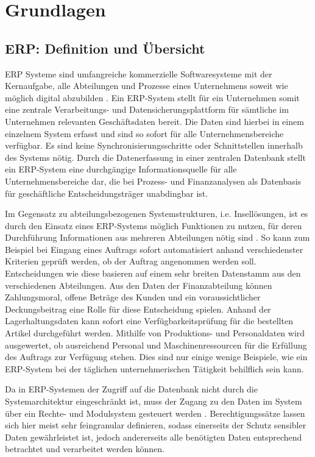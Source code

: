 \chapter{Grundlagen}
\label{cha:Stand der Technik}

\section{ERP: Definition und Übersicht}
\label{sec:ERP: Definition und Übersicht}
	ERP Systeme sind umfangreiche kommerzielle Softwaresysteme mit der Kernaufgabe, alle Abteilungen und Prozesse eines Unternehmens soweit wie möglich digital abzubilden \cite{doi:10.1002/smr.239}. Ein ERP-System stellt für ein Unternehmen somit eine zentrale Verarbeitungs- und Datensicherungsplattform für sämtliche im Unternehmen relevanten Geschäftsdaten bereit. Die Daten sind hierbei in einem einzelnem System erfasst und sind so sofort für alle Unternehmensbereiche verfügbar. Es sind keine Synchronisierungsschritte oder Schnittstellen innerhalb des Systems nötig. Durch die Datenerfassung in einer zentralen Datenbank stellt ein ERP-System eine durchgängige Informationsquelle für alle Unternehmensbereiche dar, die bei Prozess- und Finanzanalysen als Datenbasis für geschäftliche Entscheidungsträger unabdingbar ist.
	
	Im Gegensatz zu abteilungsbezogenen Systemstrukturen, i.e. Insellösungen, ist es durch den Einsatz eines ERP-Systems möglich Funktionen zu nutzen, für deren Durchführung Informationen aus mehreren Abteilungen nötig sind \cite{DynamicsNAV2018Anwenderbuch}. So kann zum Beispiel bei Eingang eines Auftrags sofort automatisiert anhand verschiedenster Kriterien geprüft werden, ob der Auftrag angenommen werden soll. Entscheidungen wie diese basieren auf einem sehr breiten Datenstamm aus den verschiedenen Abteilungen. Aus den Daten der Finanzabteilung können Zahlungsmoral, offene Beträge des Kunden und ein voraussichtlicher Deckungsbeitrag eine Rolle für diese Entscheidung spielen. Anhand der Lagerhaltungsdaten kann sofort eine Verfügbarkeitsprüfung für die bestellten Artikel durchgeführt werden. Mithilfe von Produktions- und Personaldaten wird ausgewertet, ob ausreichend Personal und Maschinenressourcen für die Erfüllung des Auftrags zur Verfügung stehen. Dies sind nur einige wenige Beispiele, wie ein ERP-System bei der täglichen unternehmerischen Tätigkeit behilflich sein kann.
	
	Da in ERP-Systemen der Zugriff auf die Datenbank nicht durch die Systemarchitektur eingeschränkt ist, muss der Zugang zu den Daten im System über ein Rechte- und Modulsystem gesteuert werden \cite{DynamicsNAV2018Anwenderbuch}. Berechtigungssätze lassen sich hier meist sehr feingranular definieren, sodass einerseits der Schutz sensibler Daten gewährleistet ist, jedoch andererseits alle benötigten Daten entsprechend betrachtet und verarbeitet werden können.

